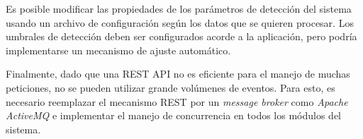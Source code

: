 \documentclass[a4paper,10pt, oneside]{article}
\begin{document}
Es posible modificar las propiedades de los parámetros de detección del sistema usando un archivo de configuración según los datos que se quieren procesar. Los umbrales de detección deben ser configurados acorde a la aplicación, pero podría implementarse un mecanismo de ajuste automático.

Finalmente, dado que una REST API no es eficiente para el manejo de muchas peticiones, no se pueden utilizar grande volúmenes de eventos. Para esto, es necesario reemplazar el mecanismo REST por un \textit{message broker} como \textit{Apache ActiveMQ} e implementar el manejo de concurrencia en todos los módulos del sistema.
\newpage
\nocite{*}
\printbibliography
\end{document}

